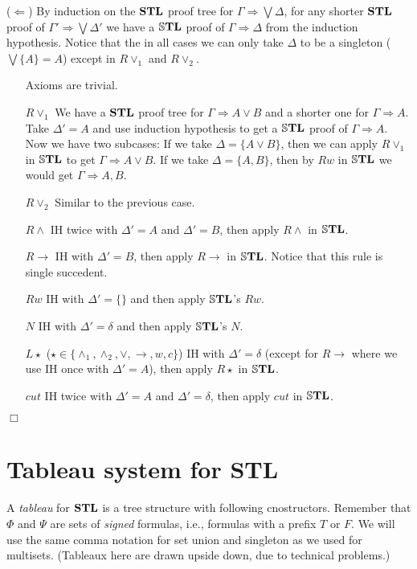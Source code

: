 \documentclass[a4paper, 12pt]{paper}
\begin{document}
($\Leftarrow$) By induction on the $\mathbf{STL}$ proof tree for $\Gamma \Rightarrow \bigvee \Delta$, for any shorter $\mathbf{STL}$ proof of $\Gamma' \Rightarrow \bigvee \Delta'$ we have a $\mathbb{S}\mathbf{TL}$ proof of $\Gamma \Rightarrow \Delta$ from the induction hypothesis. Notice that the in all cases we can only take $\Delta$ to be a singleton ($\bigvee \{ A \} = A$) except in $R \vee_1$ and $R \vee_2$.

\begin{enumerate}
  \item[Axioms] are trivial.
  \item[$R \vee_1$] We have a $\mathbf{STL}$ proof tree for $\Gamma \Rightarrow A \vee B$ and a shorter one for $\Gamma \Rightarrow A$. Take $\Delta' = A$ and use induction hypothesis to get a $\mathbb{S}\mathbf{TL}$ proof of $\Gamma \Rightarrow A$. Now we have two subcases: If we take $\Delta = \{ A \vee B \}$, then we can apply $R \vee_1$ in $\mathbb{S}\mathbf{TL}$ to get $\Gamma \Rightarrow A \vee B$. If we take $\Delta = \{ A, B \}$, then by $R w$ in $\mathbb{S}\mathbf{TL}$ we would get $\Gamma \Rightarrow A, B$.
  \item[$R \vee_2$] Similar to the previous case.
  \item[$R \wedge$] IH twice with $\Delta' = A$ and $\Delta' = B$, then apply $R \wedge$ in $\mathbb{S}\mathbf{TL}$.
  \item[$R \rightarrow$] IH with $\Delta' = B$, then apply $R \rightarrow$ in $\mathbb{S}\mathbf{TL}$. Notice that this rule is single succedent.
  \item[$R w$] IH with $\Delta' = \{\}$ and then apply $\mathbb{S}\mathbf{TL}$'s $R w$.
  \item[$N$] IH with $\Delta' = \delta$ and then apply $\mathbb{S}\mathbf{TL}$'s $N$.
  \item[$L \star$] ($\star \in \{ \wedge_1, \wedge_2, \vee, \rightarrow, w, c \}$) IH with $\Delta' = \delta$ (except for $R \rightarrow$ where we use IH once with $\Delta' = A$), then apply $R \star$ in $\mathbb{S}\mathbf{TL}$.
  \item[$cut$] IH twice with $\Delta' = A$ and $\Delta' = \delta$, then apply $cut$ in $\mathbb{S}\mathbf{TL}$.
\end{enumerate}
\begin{flushright}$\Box$\end{flushright}

\section{Tableau system for STL} A \emph{tableau} for $\mathbf{STL}$ is a tree structure with following cnostructors. Remember that $\Phi$ and $\Psi$ are sets of \emph{signed} formulas, i.e., formulas with a prefix $T$ or $F$. We will use the same comma notation for set union and singleton as we used for multisets.
(Tableaux here are drawn upside down, due to technical problems.)
\end{document}
